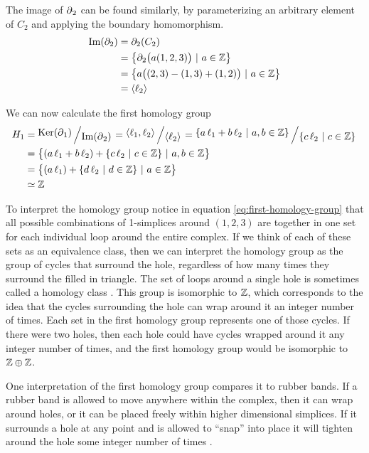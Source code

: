 \begin{example}
    The image of \(\operatorname{\partial}_2\) can be found similarly, by parameterizing an arbitrary element of \(C_2\) and applying the boundary homomorphism.
    \begin{align}
        \operatorname{Im} (\partial_2)   &= \partial_2 (C_2) \\
            &= \left\{ \partial_2 \big( a(1,2,3) \big)\ |\ a \in \mathbb{Z} \right\} \\
            &= \left\{ a\big((2,3) - (1,3) + (1,2) \big)\ |\ a \in \mathbb{Z} \right\}\\
            &= \langle \ell_2 \rangle
    \end{align}

    We can now calculate the first homology group
    \begin{align}
        H_1 &= \bigslant{\Ker(\boundary_1)}{\Ima(\boundary_{2})}
        = \bigslant{\langle \ell_1, \ell_2 \rangle}{\langle \ell_2 \rangle}
        = \bigslant{\{ a\,\ell_1 + b\,\ell_2\ |\ a,b \in \Z \}}{\{ c\,\ell_2\ |\ c \in \Z \}} \\
        &= \big\{ (a\,\ell_1 + b\,\ell_2) + \{ c\,\ell_2\ |\ c \in \Z \}\ |\ a,b \in \Z \big\} \\
        &= \big\{ (a\,\ell_1) + \{ d\,\ell_2\ |\ d \in \Z \}\ |\ a \in \Z \big\} \label{eq:first-homology-group}\\
        &\simeq \Z
    \end{align}

    To interpret the homology group notice in equation \eqref{eq:first-homology-group} that all possible combinations of 1-simplices around \((1,2,3)\) are together in one set for each individual loop around the entire complex.
    If we think of each of these sets as an equivalence class, then we can interpret the homology group as the group of cycles that surround the hole, regardless of how many times they surround the filled in triangle.
    The set of loops around a single hole is sometimes called a homology class .
    This group is isomorphic to \(\mathbb{Z}\), which corresponds to the idea that the cycles surrounding the hole can wrap around it an integer number of times.
    Each set in the first homology group represents one of those cycles.
    If there were two holes, then each hole could have cycles wrapped around it any integer number of times, and the first homology group would be isomorphic to \(\mathbb{Z} \oplus \mathbb{Z}\).

    One interpretation of the first homology group compares it to rubber bands.
    If a rubber band is allowed to move anywhere within the complex, then it can wrap around holes, or it can be placed freely within higher dimensional simplices.
    If it surrounds a hole at any point and is allowed to ``snap'' into place it will tighten around the hole some integer number of times .
\end{example}

